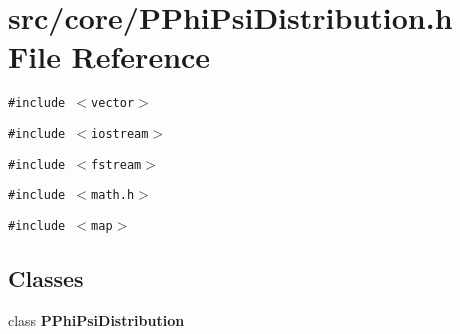 \section{src/core/PPhi\-Psi\-Distribution.h File Reference}
\label{PPhiPsiDistribution_8h}


{\tt \#include $<$vector$>$}\par
{\tt \#include $<$iostream$>$}\par
{\tt \#include $<$fstream$>$}\par
{\tt \#include $<$math.h$>$}\par
{\tt \#include $<$map$>$}\par
\subsection*{Classes}
\begin{CompactItemize}
\item 
class {\bf PPhi\-Psi\-Distribution}
\end{CompactItemize}
